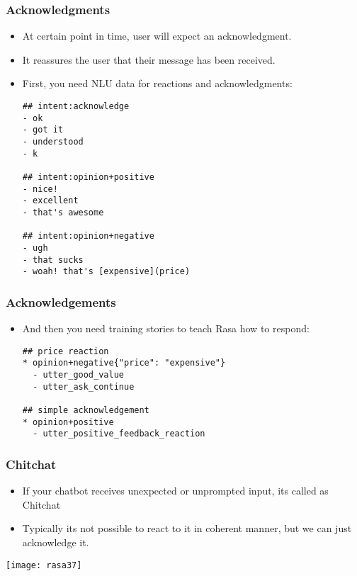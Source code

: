  \begin{frame}[fragile]\frametitle{Acknowledgments}
\begin{itemize}
\item At certain point in time, user will expect an acknowledgment.
\item It reassures the user that their message has been received.
\item First, you need NLU data for reactions and acknowledgments:
\begin{lstlisting}
## intent:acknowledge
- ok
- got it
- understood
- k

## intent:opinion+positive
- nice!
- excellent
- that's awesome

## intent:opinion+negative
- ugh
- that sucks
- woah! that's [expensive](price)
\end{lstlisting}
\end{itemize}
\end{frame}

 \begin{frame}[fragile]\frametitle{Acknowledgements}
\begin{itemize}
\item And then you need training stories to teach Rasa how to respond:
\begin{lstlisting}
## price reaction
* opinion+negative{"price": "expensive"}
  - utter_good_value
  - utter_ask_continue

## simple acknowledgement
* opinion+positive
  - utter_positive_feedback_reaction
\end{lstlisting}
\end{itemize}
\end{frame}

 \begin{frame}[fragile]\frametitle{Chitchat}
\begin{itemize}
\item If your chatbot receives unexpected or unprompted input, its called as Chitchat
\item Typically its not possible to react to it in coherent manner, but we can just acknowledge it.
\end{itemize}

\begin{center}
\texttt{[image: rasa37]}
\end{center}
\end{frame}


